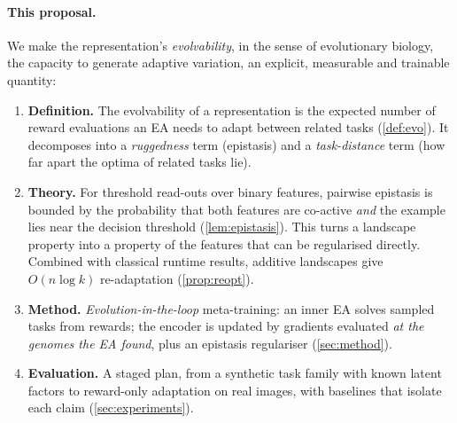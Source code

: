 \documentclass[11pt,a4paper]{article}
\theoremstyle{definition}
\theoremstyle{plain}
\theoremstyle{remark}
\begin{document}
\paragraph{This proposal.}
We make the representation's \emph{evolvability}, in the sense of evolutionary biology, the capacity to generate adaptive variation, an explicit, measurable and trainable quantity:
\begin{enumerate}[label=\textbf{C\arabic*}]
\item \textbf{Definition.} The evolvability of a representation is the expected number of reward evaluations an EA needs to adapt between related tasks (\cref{def:evo}). It decomposes into a \emph{ruggedness} term (epistasis) and a \emph{task-distance} term (how far apart the optima of related tasks lie).
\item \textbf{Theory.} For threshold read-outs over binary features, pairwise epistasis is bounded by the probability that both features are co-active \emph{and} the example lies near the decision threshold (\cref{lem:epistasis}). This turns a landscape property into a property of the features that can be regularised directly. Combined with classical runtime results, additive landscapes give $O(n\log k)$ re-adaptation (\cref{prop:reopt}).
\item \textbf{Method.} \emph{Evolution-in-the-loop} meta-training: an inner EA solves sampled tasks from rewards; the encoder is updated by gradients evaluated \emph{at the genomes the EA found}, plus an epistasis regulariser (\cref{sec:method}).
\item \textbf{Evaluation.} A staged plan, from a synthetic task family with known latent factors to reward-only adaptation on real images, with baselines that isolate each claim (\cref{sec:experiments}).
\end{enumerate}
\end{document}
